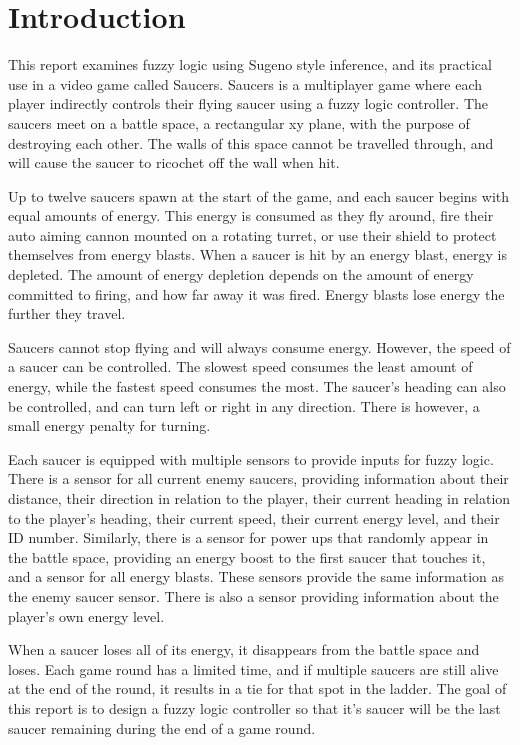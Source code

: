 \section{Introduction}

This report examines fuzzy logic using Sugeno style inference, and its practical use in a video game called Saucers. Saucers is a multiplayer game where each player indirectly controls their flying saucer using a fuzzy logic controller. The saucers meet on a battle space, a rectangular xy plane, with the purpose of destroying each other. The walls of this space cannot be travelled through, and will cause the saucer to ricochet off the wall when hit.

Up to twelve saucers spawn at the start of the game, and each saucer begins with equal amounts of energy. This energy is consumed as they fly around, fire their auto aiming cannon mounted on a rotating turret, or use their shield to protect themselves from energy blasts. When a saucer is hit by an energy blast, energy is depleted. The amount of energy depletion depends on the amount of energy committed to firing, and how far away it was fired. Energy blasts lose energy the further they travel.

Saucers cannot stop flying and will always consume energy. However, the speed of a saucer can be controlled. The slowest speed consumes the least amount of energy, while the fastest speed consumes the most. The saucer's heading can also be controlled, and can turn left or right in any direction. There is however, a small energy penalty for turning.

Each saucer is equipped with multiple sensors to provide inputs for fuzzy logic. There is a sensor for all current enemy saucers, providing information about their distance, their direction in relation to the player, their current heading in relation to the player's heading, their current speed, their current energy level, and their ID number. Similarly, there is a sensor for power ups that randomly appear in the battle space, providing an energy boost to the first saucer that touches it, and a sensor for all energy blasts. These sensors provide the same information as the enemy saucer sensor. There is also a sensor providing information about the player's own energy level.

When a saucer loses all of its energy, it disappears from the battle space and loses. Each game round has a limited time, and if multiple saucers are still alive at the end of the round, it results in a tie for that spot in the ladder. The goal of this report is to design a fuzzy logic controller so that it's saucer will be the last saucer remaining during the end of a game round.